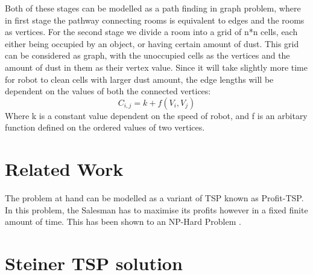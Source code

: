 \documentclass{article}
\newcommand{\Ait}{\ensuremath{A_{i \rightarrow t}}}
\newcommand{\Ati}{\ensuremath{A_{t \rightarrow i}}}
\newcommand{\Eti}{\ensuremath{E_{t \rightarrow i}}}
\newcommand{\Dti}{\ensuremath{D_{t \rightarrow i}}}
\newcommand{\Dtr}{\ensuremath{D^{(tr)}}}
\newcommand{\Dval}{\ensuremath{D^{(val)}}}
\newcommand{\TsoA}{\ensuremath{T^*(\Ati, \Ait)}}
\newcommand{\Ov}{\ensuremath{O_{i \rightarrow t}}}
\newcommand{\OsoA}{\ensuremath{\Ov^*(\Ait)}}
\newcommand{\Pv}{\ensuremath{P_{i \rightarrow t}}}
\newcommand{\PsoA}{\ensuremath{\Pv^*(\Ait)}}
\newcommand{\Gv}{\ensuremath{G_{t \rightarrow i}}}
\newcommand{\GsoA}{\ensuremath{\Gv^*(\Ati)}}
\begin{document}
Both of these stages can be modelled as a path finding in graph problem, where in first stage the pathway connecting rooms is equivalent to edges and the rooms as vertices.
For the second stage we divide a room into a grid of n*n cells, each either being occupied by an object, or having certain amount of dust. This grid can be considered as graph,
with the unoccupied cells as the vertices and the amount of dust in them as their vertex value. Since it will take slightly more time for robot to clean cells with larger dust amount,
the edge lengths will be dependent on the values of both the connected vertices:
\begin{equation}
    C_{i,j} = k + f(V_i,V_j)
\end{equation}
Where k is a constant value dependent on the speed of robot, and f is an arbitary function defined on the ordered values of two vertices.




\section{Related Work}

The problem at hand can be modelled as a variant of TSP known as Profit-TSP. In this problem,
the Salesman has to maximise its profits however in a fixed finite amount of time. 
This has been shown to an NP-Hard Problem \cite{ref1}. 


\section{Steiner TSP solution}
\end{document}
